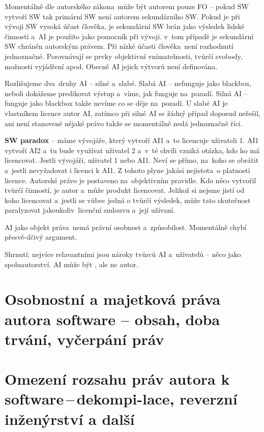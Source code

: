 \noindent Momentálně dle autorského zákona~může být autorem pouze FO -- pokud SW vytvoří SW tak primární SW není autorem sekundárního SW. Pokud je při vývoji SW vysoká účast člověka, je sekundární SW brán jako výsledek lidské činnosti a~AI je použito jako pomocník při vývoji. v~tom případě je sekundární SW chráněn autorským právem. Při nízké účasti člověka~není rozhodnutí jednoznačné. Porovnávají se prvky objektivní vnímatelnosti, tvůrčí svobody, možnosti vyjádření apod. Obecně AI jejich výtvorů není definována. 

Rozlišujeme dva~druhy AI -- silné a~slabé. Slabá AI -- nefunguje jako blackbox, neboli dokážeme predikovat výstup a~víme, jak funguje na~pozadí. Silná AI -- funguje jako blackbox takže nevíme co se děje na~pozadí. U slabé AI je vlastníkem licence autor AI, zatímco při silné AI se žádný případ doposud neřešil, ani není stanovené nějaké právo takže se momentálně nedá jednoznačně říci.

\textbf{SW paradox} -- máme vývojáře, který vytvoří AI1 a~to licencuje uživateli 1. AI1 vytvoří AI2 a~tu bude využívat uživatel 2 a~v~té chvíli vzniká otázka, kdo ho má licencovat. Jestli vývojáři, uživatel 1 nebo AI1. Neví se přímo, na~koho se obrátit a~jestli nevyžadovat i licenci k AI1. Z tohoto plyne jakási nejistota~o platnosti licence. Autorské právo je postaveno na~objektivním pravidle. Kdo něco vytvořil tvůrčí činností, je autor a~může produkt licencovat. Jelikož si nejsme jistí od koho licencovat a~jestli se vůbec jedná o tvůrčí výsledek, může tato skutečnost paralyzovat jakoukoliv~licenční smlouvu a~její užívaní.

AI jako objekt práva~nemá právní osobnost a~způsobilost. Momentálně chybí přesvě-dčivý argument. 

Shrnutí: nejvíce relavantními jsou nároky tvůrců AI a~uživatelů -- něco jako spoluautorství. AI může být , ale ne autor.

\newpage
\section{Osobnostní a majetková práva autora software -- obsah, doba trvání, vyčerpání práv}

\newpage
\section[Omezení rozsahu práv autora k software\,--\,dekompilace, reverzní inženýrství a další]{Omezení rozsahu práv autora k software\,--\,dekompi-lace, reverzní inženýrství a další}

